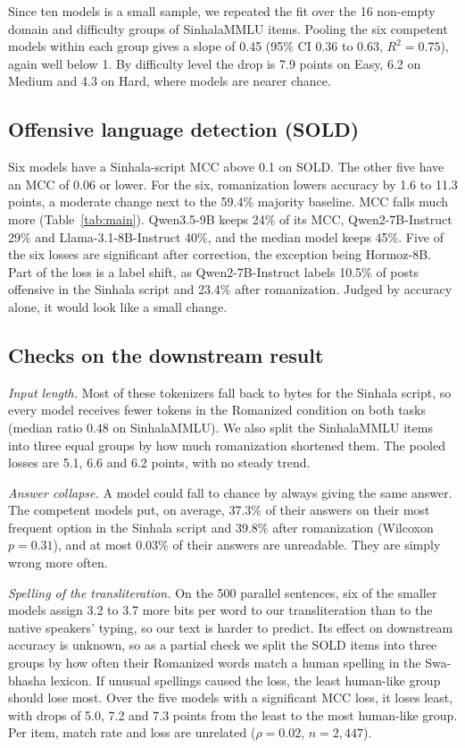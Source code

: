 \documentclass[3p,times,procedia]{elsarticle}
\begin{document}
Since ten models is a small sample, we repeated the fit over the 16 non-empty domain and difficulty groups of SinhalaMMLU items. Pooling the six competent models within each group gives a slope of 0.45 (95\% CI 0.36 to 0.63, $R^2 = 0.75$), again well below 1. By difficulty level the drop is 7.9 points on Easy, 6.2 on Medium and 4.3 on Hard, where models are nearer chance.

\subsection{Offensive language detection (SOLD)}

Six models have a Sinhala-script MCC above 0.1 on SOLD. The other five have an MCC of 0.06 or lower. For the six, romanization lowers accuracy by 1.6 to 11.3 points, a moderate change next to the 59.4\% majority baseline. MCC falls much more (Table~\ref{tab:main}). Qwen3.5-9B keeps 24\% of its MCC, Qwen2-7B-Instruct 29\% and Llama-3.1-8B-Instruct 40\%, and the median model keeps 45\%. Five of the six losses are significant after correction, the exception being Hormoz-8B. Part of the loss is a label shift, as Qwen2-7B-Instruct labels 10.5\% of posts offensive in the Sinhala script and 23.4\% after romanization. Judged by accuracy alone, it would look like a small change.

\subsection{Checks on the downstream result}
\label{sec:controls}

\textit{Input length.} Most of these tokenizers fall back to bytes for the Sinhala script, so every model receives fewer tokens in the Romanized condition on both tasks (median ratio 0.48 on SinhalaMMLU). We also split the SinhalaMMLU items into three equal groups by how much romanization shortened them. The pooled losses are 5.1, 6.6 and 6.2 points, with no steady trend.

\textit{Answer collapse.} A model could fall to chance by always giving the same answer. The competent models put, on average, 37.3\% of their answers on their most frequent option in the Sinhala script and 39.8\% after romanization (Wilcoxon $p = 0.31$), and at most 0.03\% of their answers are unreadable. They are simply wrong more often.

\textit{Spelling of the transliteration.} On the 500 parallel sentences, six of the smaller models assign 3.2 to 3.7 more bits per word to our transliteration than to the native speakers' typing, so our text is harder to predict. Its effect on downstream accuracy is unknown, so as a partial check we split the SOLD items into three groups by how often their Romanized words match a human spelling in the Swa-bhasha lexicon. If unusual spellings caused the loss, the least human-like group should lose most. Over the five models with a significant MCC loss, it loses least, with drops of 5.0, 7.2 and 7.3 points from the least to the most human-like group. Per item, match rate and loss are unrelated ($\rho = 0.02$, $n = 2{,}447$).
\end{document}
